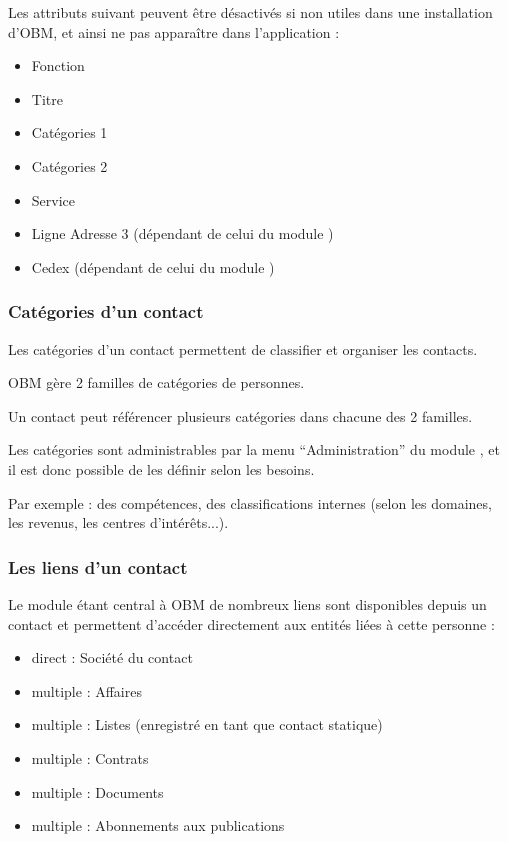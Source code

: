 Les attributs suivant peuvent être désactivés si non utiles dans une installation d'OBM, et ainsi ne pas apparaître dans l'application :

\begin{itemize}
\item Fonction
\item Titre
\item Catégories 1
\item Catégories 2
\item Service
\item Ligne Adresse 3 (dépendant de celui du module \company)
\item Cedex (dépendant de celui du module \company)
\end{itemize}


\subsubsection{Catégories d'un contact}
Les catégories d'un contact permettent de classifier et organiser les contacts.

OBM gère 2 familles de catégories de personnes.

Un contact peut référencer plusieurs catégories dans chacune des 2 familles.

Les catégories sont administrables par la menu ``Administration'' du module \contact, et il est donc possible de les définir selon les besoins.

Par exemple : des compétences, des classifications internes (selon les domaines, les revenus, les centres d'intérêts...).


\subsubsection{Les liens d'un contact}

Le module \contact étant central à OBM de nombreux liens sont disponibles depuis un contact et permettent d'accéder directement aux entités liées à cette personne :\\

\begin{itemize}
\item direct : Société du contact
\item multiple : Affaires
\item multiple : Listes (enregistré en tant que contact statique)
\item multiple : Contrats
\item multiple : Documents
\item multiple : Abonnements aux publications
\end{itemize}


